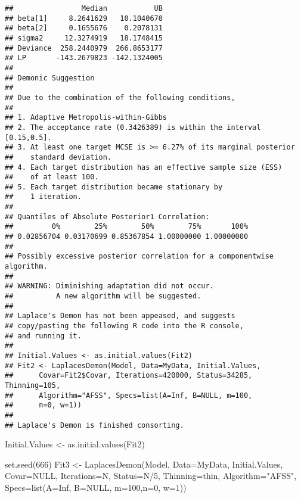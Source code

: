 \documentclass[
]{book}
\newenvironment{Shaded}{\begin{snugshade}}{\end{snugshade}}
\newcommand{\AttributeTok}[1]{\textcolor[rgb]{0.77,0.63,0.00}{#1}}
\newcommand{\ConstantTok}[1]{\textcolor[rgb]{0.00,0.00,0.00}{#1}}
\newcommand{\DecValTok}[1]{\textcolor[rgb]{0.00,0.00,0.81}{#1}}
\newcommand{\FunctionTok}[1]{\textcolor[rgb]{0.00,0.00,0.00}{#1}}
\newcommand{\NormalTok}[1]{#1}
\newcommand{\OtherTok}[1]{\textcolor[rgb]{0.56,0.35,0.01}{#1}}
\newcommand{\SpecialCharTok}[1]{\textcolor[rgb]{0.00,0.00,0.00}{#1}}
\newcommand{\StringTok}[1]{\textcolor[rgb]{0.31,0.60,0.02}{#1}}
\begin{document}
\begin{verbatim}
##                Median           UB
## beta[1]     8.2641629   10.1040670
## beta[2]     0.1655676    0.2078131
## sigma2     12.3274919   18.1748415
## Deviance  258.2440979  266.8653177
## LP       -143.2679823 -142.1324005
## 
## Demonic Suggestion
## 
## Due to the combination of the following conditions,
## 
## 1. Adaptive Metropolis-within-Gibbs
## 2. The acceptance rate (0.3426389) is within the interval [0.15,0.5].
## 3. At least one target MCSE is >= 6.27% of its marginal posterior
##    standard deviation.
## 4. Each target distribution has an effective sample size (ESS)
##    of at least 100.
## 5. Each target distribution became stationary by
##    1 iteration.
## 
## Quantiles of Absolute Posterior1 Correlation:
##         0%        25%        50%        75%       100% 
## 0.02856704 0.03170699 0.85367854 1.00000000 1.00000000 
## 
## Possibly excessive posterior correlation for a componentwise algorithm.
## 
## WARNING: Diminishing adaptation did not occur.
##          A new algorithm will be suggested.
## 
## Laplace's Demon has not been appeased, and suggests
## copy/pasting the following R code into the R console,
## and running it.
## 
## Initial.Values <- as.initial.values(Fit2)
## Fit2 <- LaplacesDemon(Model, Data=MyData, Initial.Values,
##      Covar=Fit2$Covar, Iterations=420000, Status=34285, Thinning=105,
##      Algorithm="AFSS", Specs=list(A=Inf, B=NULL, m=100,
##      n=0, w=1))
## 
## Laplace's Demon is finished consorting.
\end{verbatim}

\begin{Shaded}
\begin{Highlighting}[]
\NormalTok{Initial.Values }\OtherTok{\textless{}{-}} \FunctionTok{as.initial.values}\NormalTok{(Fit2)}

\FunctionTok{set.seed}\NormalTok{(}\DecValTok{666}\NormalTok{)}
\NormalTok{Fit3 }\OtherTok{\textless{}{-}} \FunctionTok{LaplacesDemon}\NormalTok{(Model, }\AttributeTok{Data=}\NormalTok{MyData, Initial.Values,}
     \AttributeTok{Covar=}\ConstantTok{NULL}\NormalTok{, }\AttributeTok{Iterations=}\NormalTok{N, }\AttributeTok{Status=}\NormalTok{N}\SpecialCharTok{/}\DecValTok{5}\NormalTok{, }\AttributeTok{Thinning=}\NormalTok{thin,}
     \AttributeTok{Algorithm=}\StringTok{"AFSS"}\NormalTok{, }\AttributeTok{Specs=}\FunctionTok{list}\NormalTok{(}\AttributeTok{A=}\ConstantTok{Inf}\NormalTok{, }\AttributeTok{B=}\ConstantTok{NULL}\NormalTok{, }\AttributeTok{m=}\DecValTok{100}\NormalTok{,}\AttributeTok{n=}\DecValTok{0}\NormalTok{, }\AttributeTok{w=}\DecValTok{1}\NormalTok{))}
\end{Highlighting}
\end{Shaded}
\end{document}
